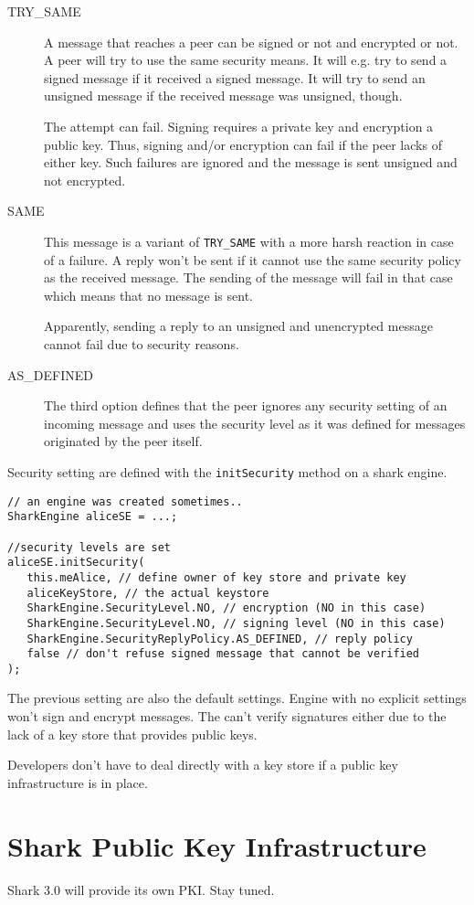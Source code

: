 \begin{description}
    \item[TRY\_SAME] A message that reaches a peer can be signed or not and encrypted or not.  A peer will try to use the same security means. It will e.g. try to send a signed message if it received a signed message. It will try to send an unsigned message if the received message was unsigned, though.

The attempt can fail. Signing requires a private key and encryption a public key. Thus, signing and/or encryption can fail if the peer lacks of either key. Such failures are ignored and the message is sent unsigned and not encrypted.

    \item[SAME] This message is a variant of {\tt TRY\_SAME} with a more harsh reaction in case of a failure. A reply won't be sent if it cannot use the same security policy as the received message. The sending of the message will fail in that case which means that no message is sent.

Apparently, sending a reply to an unsigned and unencrypted message cannot fail due to security reasons.

    \item[AS\_DEFINED] The third option defines that the peer ignores any security setting of an incoming message and uses the security level as it was defined for messages originated by the peer itself.

\end{description}

Security setting are defined with the {\tt initSecurity} method on a shark engine.

\begin{verbatim}
// an engine was created sometimes..
SharkEngine aliceSE = ...;

//security levels are set
aliceSE.initSecurity(
   this.meAlice, // define owner of key store and private key
   aliceKeyStore, // the actual keystore
   SharkEngine.SecurityLevel.NO, // encryption (NO in this case)
   SharkEngine.SecurityLevel.NO, // signing level (NO in this case) 
   SharkEngine.SecurityReplyPolicy.AS_DEFINED, // reply policy
   false // don't refuse signed message that cannot be verified
);
\end{verbatim}

The previous setting are also the default settings. Engine with no
explicit settings won't sign and encrypt messages. The can't verify signatures either due to the lack of a key store that provides public keys.

Developers don't have to deal directly with a key store if a public key infrastructure is in place.

\section{Shark Public Key Infrastructure}
Shark 3.0 will provide its own PKI. Stay tuned.


